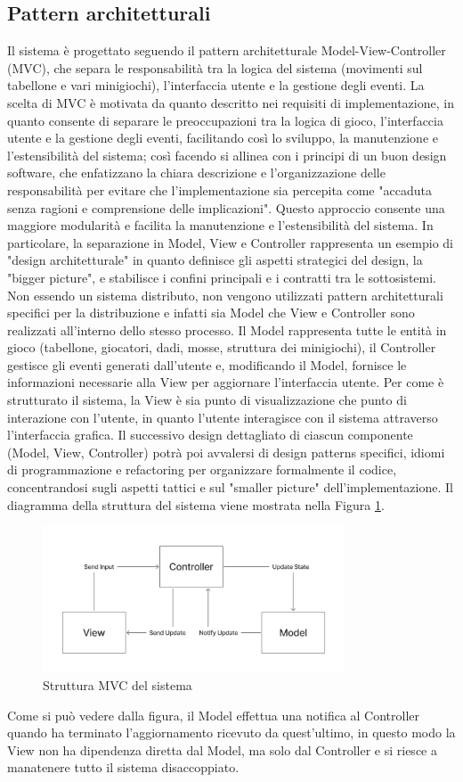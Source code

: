 \subsection{Pattern architetturali} \label{subsec:architectural_patterns}
Il sistema è progettato seguendo il pattern architetturale Model-View-Controller (MVC), che separa le responsabilità tra la
logica del sistema (movimenti sul tabellone e vari minigiochi), l'interfaccia utente e la gestione degli eventi.
La scelta di MVC è motivata da quanto descritto nei requisiti di implementazione, in quanto consente di separare
le preoccupazioni tra la logica di gioco, l'interfaccia utente e la gestione degli eventi, facilitando così lo sviluppo,
la manutenzione e l'estensibilità del sistema; così facendo si allinea con i principi di un buon design software, che enfatizzano
la chiara descrizione e l'organizzazione delle responsabilità per evitare che l'implementazione sia percepita come
"accaduta senza ragioni e comprensione delle implicazioni".
Questo approccio consente una maggiore modularità e facilita la manutenzione e l'estensibilità del sistema. In particolare, la
separazione in Model, View e Controller rappresenta un esempio di "design architetturale" in quanto definisce gli aspetti strategici 
del design, la "bigger picture", e stabilisce i confini principali e i contratti tra le sottosistemi.
Non essendo un sistema distributo, non vengono utilizzati pattern architetturali specifici per la distribuzione e infatti sia
Model che View e Controller sono realizzati all'interno dello stesso processo.
Il Model rappresenta tutte le entità in gioco (tabellone, giocatori, dadi, mosse, struttura dei minigiochi), il Controller gestisce
gli eventi generati dall'utente e, modificando il Model, fornisce le informazioni necessarie alla View per aggiornare l'interfaccia
utente. Per come è strutturato il sistema, la View è sia punto di visualizzazione che punto di interazione con l'utente, in quanto
l'utente interagisce con il sistema attraverso l'interfaccia grafica. Il successivo design dettagliato di ciascun componente
(Model, View, Controller) potrà poi avvalersi di design patterns specifici, idiomi di programmazione e refactoring per organizzare
formalmente il codice, concentrandosi sugli aspetti tattici e sul "smaller picture" dell'implementazione.
Il diagramma della struttura del sistema viene mostrata nella Figura \ref{fig:architectural-patterns}.
\begin{figure}[h!]
    \centering
    \includegraphics[width=0.8\textwidth]{figures/MVC.png}
    \caption{Struttura MVC del sistema}
    \label{fig:architectural-patterns}
\end{figure}
Come si può vedere dalla figura, il Model effettua una notifica al Controller quando ha terminato l'aggiornamento ricevuto da
quest'ultimo, in questo modo la View non ha dipendenza diretta dal Model, ma solo dal Controller e si riesce a manatenere tutto
il sistema disaccoppiato.
